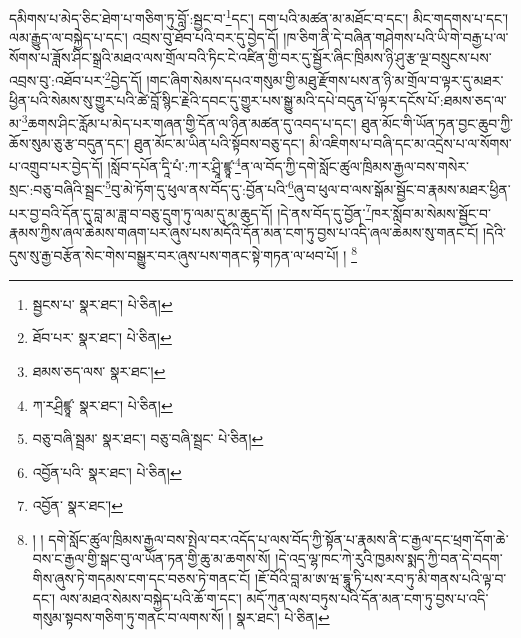 དམིགས་པ་མེད་ཅིང་ཐེག་པ་གཅིག་ཏུ་བློ་:སྦྱང་བ་\footnote{སྦྱངས་པ་  སྣར་ཐང་།  པེ་ཅིན། }དང་། དག་པའི་མཚན་མ་མཐོང་བ་དང་། མིང་གདགས་པ་དང་། ལམ་རྒྱུད་ལ་བསྐྱེད་པ་དང་། འབྲས་བུ་ཐོབ་པའི་བར་དུ་བྱེད་དོ། །ཁ་ཅིག་ནི་དེ་བཞིན་གཤེགས་པའི་ཡི་གེ་བརྒྱ་པ་ལ་སོགས་པ་ཟློས་ཤིང་སྒྲའི་མཐའ་ལས་གྲོལ་བའི་ཏིང་ངེ་འཛིན་གྱི་བར་དུ་སྦྱོར་ཞིང་ཁྲིམས་ཉི་ཤུ་རྩ་ལྔ་བསྲུངས་པས་འབྲས་བུ་:འཐོབ་པར་\footnote{ཐོབ་པར་  སྣར་ཐང་།  པེ་ཅིན། }བྱེད་དོ། །གང་ཞིག་སེམས་དཔའ་གསུམ་གྱི་མཐུ་རྫོགས་པས་ན་ཉི་མ་གྲོལ་བ་ལྟར་དུ་མཐར་ཕྱིན་པའི་སེམས་སུ་གྱུར་པའི་ཚེ་བློ་སྙིང་རྗེའི་དབང་དུ་གྱུར་པས་སྒྱུ་མའི་དཔེ་བདུན་པོ་ལྟར་དངོས་པོ་:ཐམས་ཅད་ལ་མ་\footnote{ཐམས་ཅད་ལས་  སྣར་ཐང་། }ཆགས་ཤིང་རློམ་པ་མེད་པར་གཞན་གྱི་དོན་ལ་ཉིན་མཚན་དུ་འབད་པ་དང་། ཐུན་མོང་གི་ཡོན་ཏན་བྱང་ཆུབ་ཀྱི་ཆོས་སུམ་ཅུ་རྩ་བདུན་དང་། ཐུན་མོང་མ་ཡིན་པའི་སྟོབས་བཅུ་དང་། མི་འཇིགས་པ་བཞི་དང་མ་འདྲེས་པ་ལ་སོགས་པ་འགྲུབ་པར་བྱེད་དོ། །སློབ་དཔོན་དཱི་པཾ་:ཀ་ར་ཤྲཱི་ཛྙཱ་\footnote{ཀ་རཤྲིཛྙཱ་  སྣར་ཐང་།  པེ་ཅིན། }ན་ལ་བོད་ཀྱི་དགེ་སློང་ཚུལ་ཁྲིམས་རྒྱལ་བས་གསེར་སྲང་:བཅུ་བཞིའི་སྦྲང་\footnote{བཅུ་བཞི་སྦྲམ་  སྣར་ཐང་། བཅུ་བཞི་སྦྲང་  པེ་ཅིན། }བུ་མེ་ཏོག་དུ་ཕུལ་ནས་བོད་དུ་:བྱོན་པའི་\footnote{འབྱོན་པའི་  སྣར་ཐང་།  པེ་ཅིན། }ཞུ་བ་ཕུལ་བ་ལས་སྒོམ་སྦྱོང་བ་རྣམས་མཐར་ཕྱིན་པར་བྱ་བའི་དོན་དུ་བླ་མ་ཟླ་བ་བཅུ་དྲུག་ཏུ་ལམ་དུ་མ་ཆུད་དོ། །དེ་ནས་བོད་དུ་བྱོན་\footnote{འབྱོན་  སྣར་ཐང་། }ཁར་སློབ་མ་སེམས་སྦྱོང་བ་རྣམས་ཀྱིས་ཞལ་ཆེམས་གཞག་པར་ཞུས་པས་མདོའི་དོན་མན་ངག་ཏུ་བྱས་པ་འདི་ཞལ་ཆེམས་སུ་གནང་ངོ། །དེའི་དུས་སུ་རྒྱ་བརྩོན་སེང་གེས་བསྒྱུར་བར་ཞུས་པས་གནང་སྟེ་གཏན་ལ་ཕབ་པོ། ། \footnote{། ། དགེ་སློང་ཚུལ་ཁྲིམས་རྒྱལ་བས་སྤེལ་བར་འདོད་པ་ལས་བོད་ཀྱི་སྟོན་པ་རྣམས་ནི་ང་རྒྱལ་དང་ཕྲག་དོག་ཆེ་བས་ང་རྒྱལ་གྱི་སྒང་བུ་ལ་ཡོན་ཏན་གྱི་ཆུ་མ་ཆགས་སོ། །དེ་འདྲ་ལྷ་ཁང་ཀེ་རུའི་ཁྱམས་སྨད་ཀྱི་བན་དེ་བདག་གིས་ཞུས་ཏེ་གདམས་ངག་དང་བཅས་ཏེ་གནང་ངོ། །ཇོ་བོའི་བླ་མ་ཨ་ཝ་དྷཱུ་ཏི་པས་རབ་ཏུ་མི་གནས་པའི་ལྟ་བ་དང་། ལས་མཐའ་སེམས་བསྐྱེད་པའི་ཆོ་ག་དང་། མདོ་ཀུན་ལས་བཏུས་པའི་དོན་མན་ངག་ཏུ་བྱས་པ་འདི་གསུམ་སྟབས་གཅིག་ཏུ་གནང་བ་ལགས་སོ། །  སྣར་ཐང་།  པེ་ཅིན། }